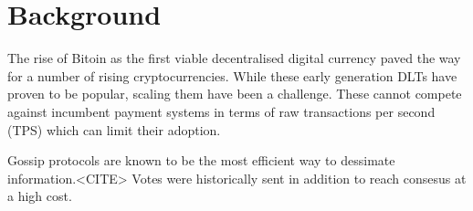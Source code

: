 \section{Background}

The rise of Bitoin as the first viable decentralised digital currency paved the way for a number of rising cryptocurrencies. While these early generation DLTs have proven to be popular, scaling them have been a challenge. These cannot compete against incumbent payment systems in terms of raw transactions per second (TPS) which can limit their adoption. 


Gossip protocols are known to be the most efficient way to dessimate information.<CITE> Votes were historically sent in addition to reach consesus at a high cost. 
